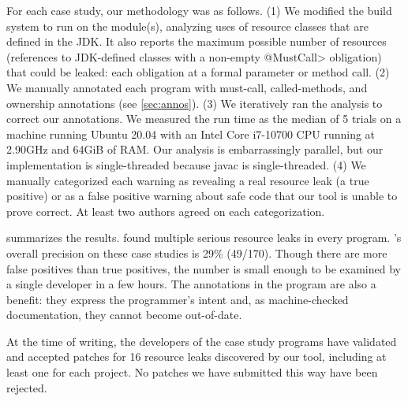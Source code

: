 For each case study, our methodology was as follows.
(1)
We modified the
build system to run \tool on the module(s), analyzing uses of resource
classes that are defined in the JDK\@.
It also reports the maximum possible number of resources (references to JDK-defined
classes with a non-empty \<@MustCall> obligation) that could be
leaked:  each obligation at a formal parameter or method call.
(2) We manually
annotated each program with must-call, called-methods, and ownership
annotations (see \cref{sec:annos}).
(3) We iteratively ran the analysis to correct our annotations.
We measured the run time
as the median of 5 trials on
a machine running Ubuntu 20.04 with an Intel Core i7-10700 CPU running at 2.90GHz and 64GiB of RAM\@.
Our analysis is embarrassingly parallel, but our implementation is
single-threaded because javac is single-threaded.
(4) We manually categorized each warning as revealing a
real resource leak (a true positive) or as a
false positive warning about safe code that our tool is unable to prove correct.
At least two authors agreed on each categorization.

 summarizes the results. \Tool found multiple
serious resource leaks in every program. \Tool's overall precision on
these case studies is 29\% (49/170). Though there are more false positives
than true positives,
the number is small enough to be examined by a single developer in a
few hours.
The annotations in the program are
also a benefit: they
express the programmer's intent and, as machine-checked documentation,
they cannot become out-of-date.

%
At the time of writing,
the developers of the case study programs have validated and accepted
patches for 16 resource leaks discovered by our tool, including at least
one for each project.
No patches we have submitted this way have been rejected.

